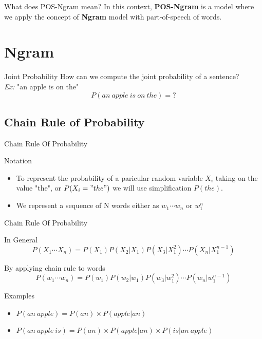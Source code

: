 \documentclass{beamer}
\begin{document}
\begin{frame}{What does POS-Ngram mean?}
In this context, \textbf{POS-Ngram} is a model where we apply the concept of \textbf{Ngram} model with part-of-speech of words.
\end{frame}


\section{Ngram}

\begin{frame}{Joint Probability}
How can we compute the joint probability of a sentence?\\
\textit{Ex:} "an apple is on the" \\
    $$P(an\ apple\ is\ on\ the) = \text{?}$$

\end{frame}
\subsection{Chain Rule of Probability}
\begin{frame}{Chain Rule Of Probability}
    \begin{block}{Notation}
        \begin{itemize}
            \item To represent the probability of a paricular random variable $X_i$ taking on the value "the", or $P(X_i="the")$ we will use simplification $P(the)$.
            \item We represent a sequence of N words either as $w_1\cdots w_n$ or $w_1^n$
        \end{itemize}
    \end{block}

\end{frame}

\begin{frame}{Chain Rule Of Probability}
    \begin{block}{In General}
        $$P(X_1\cdots X_n) = P(X_1)P(X_2|X_1)P(X_3|X_1^2)\cdots P(X_n|X_1^{n-1})$$
    \end{block}
    \begin{block}{By applying chain rule to words}
        $$P(w_1\cdots w_n) = P(w_1)P(w_2|w_1)P(w_3|w_1^2)\cdots P(w_n|w_1^{n-1})$$
    \end{block}

    \begin{block}{Examples}
        \begin{itemize}
            \item $P(an\ apple) = P(an)\times P(apple|an)$
            \item $P(an\ apple\ is) = P(an)\times P(apple| an) \times P(is | an\ apple)$
        \end{itemize}
    \end{block}

\end{frame}
\end{document}
